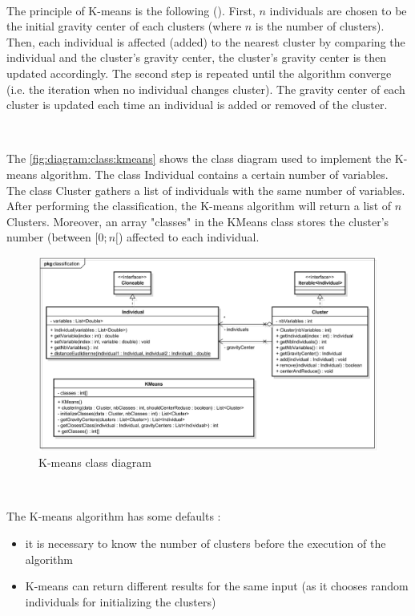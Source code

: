 ~~ 

The principle of K-means is the following (\cite{bib:clustering:AnalyseDesDonnees}). First, $n$ \glspl{individual} are chosen to be the initial gravity center of each \glspl{cluster} (where $n$ is the number of clusters). Then, each individual is affected (added) to the nearest \gls{cluster} by comparing the \gls{individual} and the \gls{cluster}'s gravity center, the \gls{cluster}'s gravity center is then  updated accordingly. The second step is repeated until the \gls{algorithm} converge (i.e. the iteration when no \gls{individual} changes \gls{cluster}). The gravity center of each \gls{cluster} is updated each time an \gls{individual} is added or removed of the \gls{cluster}.

~~

The \vref{fig:diagram:class:kmeans} shows the class diagram used to implement the K-means \gls{algorithm}. The class Individual contains a certain number of variables. The class Cluster gathers a list of individuals with the same number of variables. After performing the classification, the K-means \gls{algorithm} will return a list of $n$ Clusters. Moreover, an array "classes" in the KMeans class stores the \gls{cluster}'s number (between $[0;n[$) affected to each \gls{individual}.


\begin{figure}[h]
	\centering 
	\includegraphics[width=1\textwidth]{images/diagrams/class_diagram_kmeans}
	\caption{K-means class diagram}
	\label{fig:diagram:class:kmeans}
\end{figure}

~~

The K-means \gls{algorithm} has some defaults : 
\begin{itemize}
	\item it is necessary to know the number of clusters before the execution of the \gls{algorithm}
	\item K-means can return different results for the same input (as it chooses random \glspl{individual} for initializing the \glspl{cluster})
\end{itemize}





